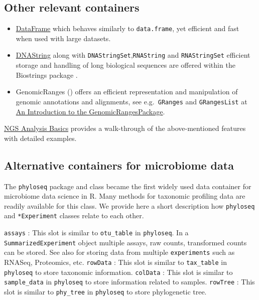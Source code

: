 \documentclass[
]{book}
\providecommand{\tightlist}{%
  \setlength{\itemsep}{0pt}\setlength{\parskip}{0pt}}
\begin{document}
\hypertarget{other-relevant-containers}{%
\subsection{Other relevant containers}\label{other-relevant-containers}}

\begin{itemize}
\tightlist
\item
  \href{https://rdrr.io/bioc/S4Vectors/man/DataFrame-class.html}{DataFrame} which behaves similarly to \texttt{data.frame}, yet efficient and fast when used with large datasets.
\item
  \href{https://rdrr.io/bioc/Biostrings/man/DNAString-class.html}{DNAString} along with \texttt{DNAStringSet},\texttt{RNAString} and \texttt{RNAStringSet} efficient storage and handling of long biological sequences are offered within the Biostrings package \citep{R_Biostrings}.
\item
  GenomicRanges (\citep{GenomicRanges2013}) offers an efficient representation and manipulation of genomic annotations and alignments, see e.g.~\texttt{GRanges} and \texttt{GRangesList} at \href{https://bioconductor.org/packages/release/bioc/vignettes/GenomicRanges/inst/doc/GenomicRangesIntroduction.html}{An Introduction to the GenomicRangesPackage}.
\end{itemize}

\href{http://girke.bioinformatics.ucr.edu/GEN242/tutorials/rsequences/rsequences/}{NGS Analysis Basics} provides a walk-through of the above-mentioned features with detailed examples.

\hypertarget{alternative-containers-for-microbiome-data}{%
\subsection{Alternative containers for microbiome data}\label{alternative-containers-for-microbiome-data}}

The \texttt{phyloseq} package and class became the first widely used data
container for microbiome data science in R. Many methods for taxonomic
profiling data are readily available for this class. We provide here a
short description how \texttt{phyloseq} and \texttt{*Experiment} classes relate to
each other.

\texttt{assays} : This slot is similar to \texttt{otu\_table} in \texttt{phyloseq}. In a
\texttt{SummarizedExperiment} object multiple assays, raw
counts, transformed counts can be stored. See also
\citeyearpar{Ramos2017}
for storing data from multiple \texttt{experiments} such as
RNASeq, Proteomics, etc. \texttt{rowData} : This slot is
similar to \texttt{tax\_table} in \texttt{phyloseq} to store taxonomic
information. \texttt{colData} : This slot is similar to
\texttt{sample\_data} in \texttt{phyloseq} to store information
related to samples. \texttt{rowTree} : This slot is similar
to \texttt{phy\_tree} in \texttt{phyloseq} to store phylogenetic tree.
\end{document}

